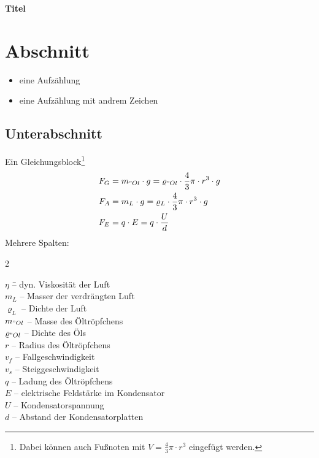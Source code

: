 \documentclass[a4paper,fleqn]{article}
\newcommand\titlelab{Titel}
\newcommand\tab[1][0.5cm]{\hspace*{#1}}
\begin{document}
\begin{center}
	\Large \textbf{\titlelab}
\end{center}
\tableofcontents
\hrulefill

\section{Abschnitt}
\begin{itemize}
    \item eine Aufzählung
    \item[1785] eine Aufzählung mit andrem Zeichen 
\end{itemize}

\subsection{Unterabschnitt}

Ein Gleichungsblock\footnote{Dabei können auch Fußnoten mit $V = \frac{4}{3}\pi \cdot r^3$ eingefügt werden.}
\begin{align}
	F_G &= m_{"Ol}\cdot g = \varrho_{"Ol}\cdot \frac{4}{3}\pi \cdot r^3 \cdot g \label{eq:F_G}\\
	F_A &= m_L \cdot g = \varrho_L\cdot \frac{4}{3}\pi \cdot r^3 \cdot g \label{eq:F_A}\\
	F_E &= q\cdot E = q \cdot \frac{U}{d} \label{eq:F_E}
\end{align}
Mehrere Spalten:

\begin{center}
	\begin{minipage}{0.9\textwidth}
		\begin{multicols}{2}
			\begin{tabbing}
				$\eta$ \tab \= – dyn. Viskosität der Luft \\
				$m_L$ \> – Masser der verdrängten Luft \\
				$\varrho_L$ \> – Dichte der Luft \\
				$m_{"Ol}$ \> – Masse des Öltröpfchens \\
				$\varrho_{"Ol}$ \> – Dichte des Öls \\
				$r$ \> – Radius des Öltröpfchens \\
				$v_f$ \> – Fallgeschwindigkeit \\
				$v_s$ \> – Steiggeschwindigkeit \\
				$q$ \> – Ladung des Öltröpfchens \\
				$E$ \> – elektrische Feldstärke im Kondensator \\
				$U$ \> – Kondensatorspannung \\
				$d$ \> – Abstand der Kondensatorplatten
			\end{tabbing}
		\end{multicols}
	\end{minipage}
\end{center}
\end{document}
